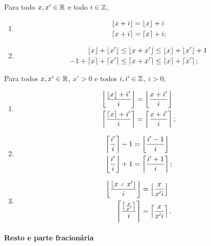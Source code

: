 \begin{proposition}
Para todo $x, x' \in \mathbb{R}$ e todo $i \in \mathbb{Z}$,
	\begin{enumerate}
	\item
		\begin{align*}
		\left\lfloor{x+i}\right\rfloor &= \left\lfloor{x}\right\rfloor+i \\
		\left\lceil{x+i}\right\rceil &= \left\lceil{x}\right\rceil+i;
		\end{align*}

	\item
		\begin{align*}
		\left\lfloor{x}\right\rfloor+\left\lfloor{x'}\right\rfloor &\leq \left\lfloor{x+x'}\right\rfloor \leq \left\lfloor{x}\right\rfloor+\left\lfloor{x'}\right\rfloor+1 \\
		-1+\left\lceil{x}\right\rceil+\left\lceil{x'}\right\rceil &\leq \left\lceil{x+x'}\right\rceil \leq \left\lceil{x}\right\rceil+\left\lceil{x'}\right\rceil;
		\end{align*}
	\end{enumerate}
\end{proposition}



\begin{proposition}
Para todos $x,x' \in \mathbb{R}$, $x'>0$ e todos $i,i' \in \mathbb{Z}$, $i>0$,
	\begin{enumerate}
	\item 
		\begin{align*}
		\left\lfloor{\frac{\left\lfloor{x}\right\rfloor+i'}{i}}\right\rfloor &= \left\lfloor{\frac{x+i'}{i}}\right\rfloor \\
		\left\lceil{\frac{\left\lceil{x}\right\rceil+i'}{i}}\right\rceil &= \left\lceil{\frac{x+i'}{i}}\right\rceil;
		\end{align*}

	\item
		\begin{align*}
		\left\lceil{\frac{i'}{i}}\right\rceil - 1 &= \left\lfloor{\frac{i'-1}{i}}\right\rfloor \\
		\left\lfloor{\frac{i'}{i}}\right\rfloor + 1 &= \left\lceil{\frac{i'+1}{i}}\right\rceil;
		\end{align*}

	\item	
		\begin{align*}
		\chao{\frac{\chao{x \div x'}}{i}} &= \chao{\frac{x}{x'i}} \\	
		\teto{\frac{\teto{\frac{x}{x'}}}{i}} &= \teto{\frac{x}{x'i}}.
		\end{align*}
	
	\end{enumerate}
\end{proposition}




\paragraph{Resto e parte fracionária}

